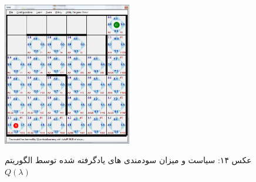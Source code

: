 \documentclass[10pt,a4paper]{article}
\begin{document}
\begin{figure}[H]
    \centering
    \includegraphics[width=0.5\textwidth]{qlambda}
    \begin{center}
    \textarabic{عکس ۱۴: سیاست و میزان سودمندی های یادگرفته شده توسط الگوریتم $Q(\lambda)$ }
    \end{center}
\end{figure}
\end{document}
